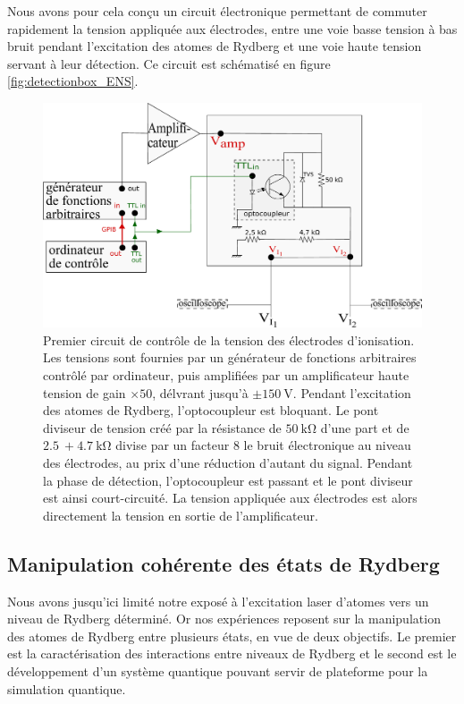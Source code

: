Nous avons pour cela conçu un circuit électronique permettant de commuter rapidement la tension appliquée aux électrodes, entre une voie basse tension à bas bruit pendant l'excitation des atomes de Rydberg et une voie haute tension servant à leur détection.
Ce circuit est schématisé en figure \eqref{fig:detectionbox_ENS}.
%
\begin{figure}[!h]
\centering
\includegraphics[width=.8\linewidth]{figures/setup/rydberg/detectionbox_ENS}
\caption[Premier circuit de contrôle de la tension des électrodes d'ionisation]{
Premier circuit de contrôle de la tension des électrodes d'ionisation.
Les tensions sont fournies par un générateur de fonctions arbitraires contrôlé par ordinateur, puis amplifiées par un amplificateur haute tension de gain $\times \num{50}$, délvrant jusqu'à $\pm \SI{150}{\V}$.
Pendant l'excitation des atomes de Rydberg, l'optocoupleur est bloquant.
Le pont diviseur de tension créé par la résistance de $\SI{50}{\kilo\ohm}$ d'une part et de $\SI{2.5}{} + \SI{4.7}{\kilo\ohm}$ divise par un facteur $\num{8}$ le bruit électronique au niveau des électrodes, au prix d'une réduction d'autant du signal.
Pendant la phase de détection, l'optocoupleur est passant et le pont diviseur est ainsi court-circuité.
La tension appliquée aux électrodes est alors directement la tension en sortie de l'amplificateur.
}
\label{fig:detectionbox_ENS}
\end{figure}
%

\subsection{Manipulation cohérente des états de Rydberg}\label{subsec:mw_spectro}

\noindent Nous avons jusqu'ici limité notre exposé à l'excitation laser d'atomes vers un niveau de Rydberg déterminé.
Or nos expériences reposent sur la manipulation des atomes de Rydberg entre plusieurs états, en vue de deux objectifs.
Le premier est la caractérisation des interactions entre niveaux de Rydberg et le second est le développement d'un système quantique pouvant servir de plateforme pour la simulation quantique.

